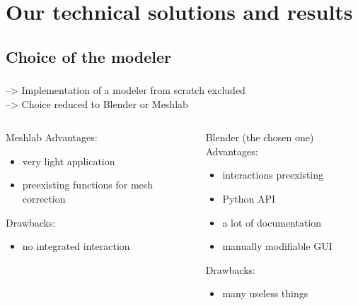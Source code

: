\documentclass{beamer}
\begin{document}
\section{Our technical solutions and results}

\subsection{Choice of the modeler}
\begin{frame}
	\frametitle{}
		--> Implementation of a modeler from scratch excluded \\
		--> Choice reduced to Blender or Meshlab
    \begin{columns}[t]
  	\begin{column}{5cm}
  		\begin{block}{Meshlab}
  		Advantages:
  		\begin{itemize}
  		\item very light application
  		\item preexisting functions for mesh correction
  		\end{itemize}
  		
  		Drawbacks:
  		\begin{itemize}
  		\item no integrated interaction
  		\end{itemize}
 	 	\end{block}   
  	\end{column}
  
  	\begin{column}{5cm}
  		\begin{block}{Blender (the chosen one)}
  		Advantages:
  		\begin{itemize}
  		\item interactions preexisting 
  		\item Python API  
  		\item a lot of documentation
  		\item manually modifiable GUI
  		\end{itemize}
  		
  		Drawbacks:
  		\begin{itemize}
  		\item many useless things
  		\end{itemize}
 	 	\end{block}   
  	\end{column}
 	\end{columns}  
    
\end{frame}
\end{document}
